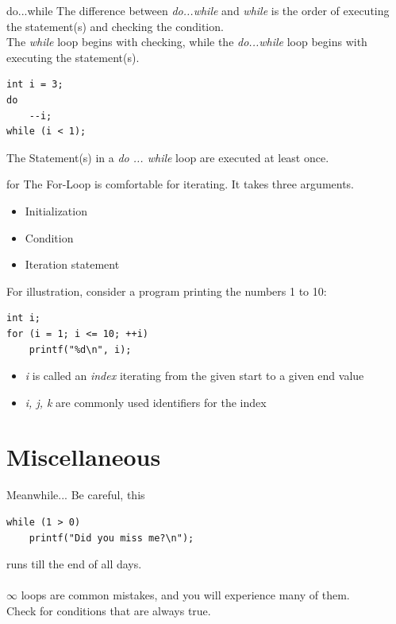 \begin{frame}[fragile]{do...while}
	The difference between \textit{do...while} and \textit{while} is the order of executing the statement(s) and checking the condition.\\
	\bigskip
	The \textit{while} loop begins with checking, while the \textit{do...while} loop begins with executing the statement(s).
	\begin{lstlisting}[numbers=none]
int i = 3;
do
	--i;
while (i < 1);
\end{lstlisting}
	\bigskip
	The Statement(s) in a \textit{do ... while} loop are executed at least once.
\end{frame}

\begin{frame}[fragile]{for}
	The For-Loop is comfortable for iterating. It takes three arguments.
	\begin{itemize}
		\item Initialization
		\item Condition
		\item Iteration statement
	\end{itemize}
	\bigskip
	For illustration, consider a program printing the numbers 1 to 10:
	\begin{lstlisting}[numbers=none]
int i;
for (i = 1; i <= 10; ++i)
	printf("%d\n", i);
\end{lstlisting}
	\begin{itemize}
		\item \textit{i} is called an \textit{index} iterating from the given start to a given end value
		\item \textit{i, j, k} are commonly used identifiers for the index
	\end{itemize}
\end{frame}

\section{Miscellaneous}
\begin{frame}[fragile]{Meanwhile...}
	Be careful, this
	\begin{lstlisting}[numbers=none]
while (1 > 0)
	printf("Did you miss me?\n");
\end{lstlisting}
runs till the end of all days.\\
\ \\$\infty$ loops are common mistakes, and you will experience many of them.\\
Check for conditions that are always true.
\end{frame}

